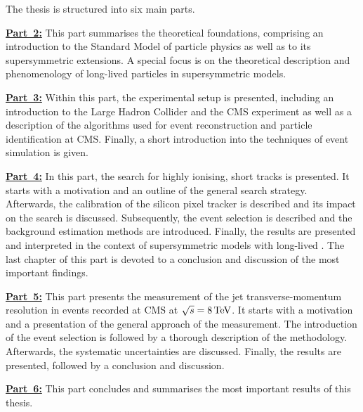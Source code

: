 \noindent The thesis is structured into six main parts.
\begin{description} 
\item \textbf{\hyperref[part:Theory]{Part~2:}} This part summarises the theoretical foundations, comprising an introduction to the Standard Model of particle physics as well as to its supersymmetric extensions. A special focus is on the theoretical description and phenomenology of long-lived particles in supersymmetric models. 
\item \textbf{\hyperref[part:Experiment]{Part~3:}} Within this part, the experimental setup is  presented, including an introduction to the Large Hadron Collider and the CMS experiment as well as a description of the algorithms used for event reconstruction and particle identification at CMS. Finally, a short introduction into the techniques of event simulation is given.
\item \textbf{\hyperref[part:analysis]{Part~4:}}  In this part, the search for highly ionising, short tracks is presented. It starts with a motivation and an outline of the general search strategy. Afterwards, the calibration of the silicon pixel tracker is described and its impact on the search is discussed. Subsequently, the event selection is described and the background estimation methods are introduced. Finally, the results are presented and interpreted in the context of supersymmetric models with long-lived \chipm. The last chapter of this part is devoted to a conclusion and discussion of the most important findings.
\item \textbf{\hyperref[part:resolution]{Part~5:}} This part presents the measurement of the jet transverse-momentum resolution in \GAMJET events recorded at CMS at $\sqrt{s}=8\,\text{Te}\kern-0.06667em\text{V}$. It starts with a motivation and a presentation of the general approach of the measurement. The introduction of the event selection is followed by a thorough description of the methodology. Afterwards, the systematic uncertainties are discussed. Finally, the results are presented, followed by a conclusion and discussion.
\item \textbf{\hyperref[part:Summary]{Part~6:}} This part concludes and summarises the most important results of this thesis. 
\end{description}

